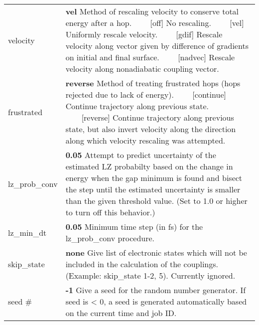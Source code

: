 \documentclass{report}
\newcommand{\tabitem}{~~\llap{--}~~}
\begin{document}
\begin{tabularx}{\textwidth}{ m{2.5cm} X }
velocity		&
	\textbf{vel} \newline
	Method of rescaling velocity to conserve total energy after a hop. \newline
	\tabitem [off] No rescaling. \newline
	\tabitem [vel] Uniformly rescale velocity. \newline
	\tabitem [gdif] Rescale velocity along vector given by difference of gradients on initial and final surface. \newline
	\tabitem [nadvec] Rescale velocity along nonadiabatic coupling vector. \\

frustrated		&
	\textbf{reverse} \newline
	Method of treating frustrated hops (hops rejected due to lack of energy). \newline
	\tabitem [continue] Continue trajectory along previous state. \newline
	\tabitem [reverse] Continue trajectory along previous state, but also invert velocity along the direction along which velocity rescaling was attempted. \\

lz\_prob\_conv	&
	\textbf{0.05} \newline
	Attempt to predict uncertainty of the estimated LZ probabilty based on the change in energy when the gap minimum is found and bisect the step until the estimated uncertainty is smaller than the given threshold value. (Set to 1.0 or higher to turn off this behavior.) \\

lz\_min\_dt	&
	\textbf{0.05} \newline
    Minimum time step (in fs) for the lz\_prob\_conv procedure. \\

skip\_state		&
	\textbf{none} \newline
	Give list of electronic states which will not be included in the calculation of the couplings. (Example: skip\_state 1-2, 5). Currently ignored. \\
	
seed \# 		&
	\textbf{-1} \newline
	Give a seed for the random number generator. If seed is < 0, a seed is generated automatically based on the current time and job ID. \\
\end{tabularx}
\end{document}
